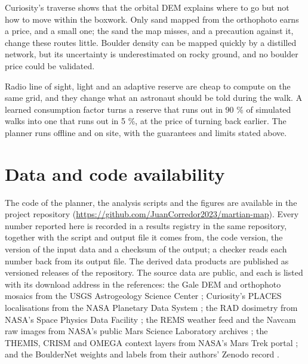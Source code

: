 \documentclass[11pt,a4paper]{article}
\begin{document}
Curiosity's traverse shows that the orbital DEM explains where to go but not how to move within the boxwork. Only sand mapped from the orthophoto earns a price, and a small one; the sand the map misses, and a precaution against it, change these routes little. Boulder density can be mapped quickly by a distilled network, but its uncertainty is underestimated on rocky ground, and no boulder price could be validated.

Radio line of sight, light and an adaptive reserve are cheap to compute on the same grid, and they change what an astronaut should be told during the walk. A learned consumption factor turns a reserve that runs out in 90 \% of simulated walks into one that runs out in 5 \%, at the price of turning back earlier. The planner runs offline and on site, with the guarantees and limits stated above.

\section*{Data and code availability}

The code of the planner, the analysis scripts and the figures are available in the project repository (\url{https://github.com/JuanCorredor2023/martian-map}). Every number reported here is recorded in a results registry in the same repository, together with the script and output file it comes from, the code version, the version of the input data and a checksum of the output; a checker reads each number back from its output file. The derived data products are published as versioned releases of the repository. The source data are public, and each is listed with its download address in the references: the Gale DEM and orthophoto mosaics from the USGS Astrogeology Science Center \cite{Parker2016,HiRISE-Gale}; Curiosity's PLACES localisations from the NASA Planetary Data System \cite{PLACES}; the RAD dosimetry from NASA's Space Physics Data Facility \cite{RAD-L2}; the REMS weather feed and the Navcam raw images from NASA's public Mars Science Laboratory archives \cite{REMS-feed,MSL-raw}; the THEMIS, CRISM and OMEGA context layers from NASA's Mars Trek portal \cite{THEMIS-night,MarsTrek}; and the BoulderNet weights and labels from their authors' Zenodo record \cite{Prieur2023}.
\end{document}
